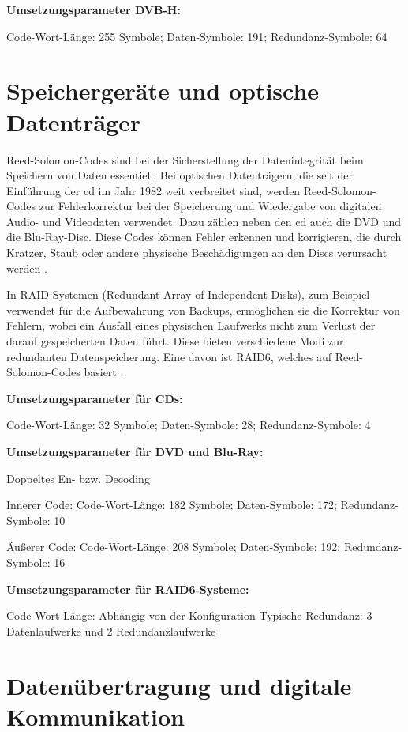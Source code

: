 \textbf{Umsetzungsparameter DVB-H:}

Code-Wort-Länge: 255 Symbole;
Daten-Symbole: 191;
Redundanz-Symbole: 64

\section{Speichergeräte und optische Datenträger}

Reed-Solomon-Codes sind bei der Sicherstellung der Datenintegrität beim Speichern von Daten essentiell. 
Bei optischen Datenträgern, die seit der Einführung der \acrfull{cd} im Jahr 1982 weit verbreitet sind, werden Reed-Solomon-Codes zur Fehlerkorrektur bei der Speicherung und Wiedergabe von digitalen Audio- und Videodaten verwendet. Dazu zählen neben den \acrshort{cd} auch die DVD und die Blu-Ray-Disc. 
Diese Codes können Fehler erkennen und korrigieren, die durch Kratzer, Staub oder andere physische Beschädigungen an den Discs verursacht werden \cite{changReedSolomonProductCodeRSPC1998}. 

In RAID-Systemen (Redundant Array of Independent Disks), zum Beispiel verwendet für die Aufbewahrung von Backups, ermöglichen sie die Korrektur von Fehlern, wobei ein Ausfall eines physischen Laufwerks nicht zum Verlust der darauf gespeicherten Daten führt.
Diese bieten verschiedene Modi zur redundanten Datenspeicherung.
Eine davon ist RAID6, welches auf Reed-Solomon-Codes basiert \cite{RAIDStorageTechnology2021}.

\textbf{Umsetzungsparameter für CDs:}

Code-Wort-Länge: 32 Symbole;
Daten-Symbole: 28;
Redundanz-Symbole: 4

\textbf{Umsetzungsparameter für DVD und Blu-Ray:}

Doppeltes En- bzw. Decoding

Innerer Code:
Code-Wort-Länge: 182 Symbole;
Daten-Symbole: 172;
Redundanz-Symbole: 10

Äußerer Code:
Code-Wort-Länge: 208 Symbole;
Daten-Symbole: 192;
Redundanz-Symbole: 16

\textbf{Umsetzungsparameter für RAID6-Systeme:}

Code-Wort-Länge: Abhängig von der Konfiguration
Typische Redundanz: 3 Datenlaufwerke und 2 Redundanzlaufwerke

\section{Datenübertragung und digitale Kommunikation}

